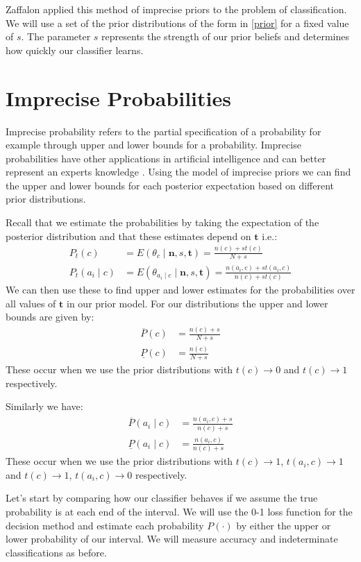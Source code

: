 Zaffalon applied this method of imprecise priors to the problem of classification.
We will use a set of the prior distributions of the form in \cref{prior} for a fixed value of $s$.
The parameter $s$ represents the strength of our prior beliefs and determines how quickly our classifier learns.

\section{Imprecise Probabilities}

Imprecise probability refers to the partial specification of a probability for example through upper and lower bounds for a probability.
Imprecise probabilities have other applications in artificial intelligence and can better represent an experts knowledge \cite{Coolen11}.
Using the model of imprecise priors we can find the upper and lower bounds for each posterior expectation based on different prior distributions.

Recall that we estimate the probabilities by taking the expectation of the posterior distribution and that these estimates depend on $\mathbf{t}$ i.e.:
\begin{align}
	P_t(c) & = E(\theta_c \mid \mathbf{n},s,\mathbf{t}) = \frac{n(c) + st(c)}{N + s} \\
	P_t(a_i \mid c) & = E(\theta_{a_i \mid c} \mid \mathbf{n},s,\mathbf{t}) = \frac{n(a_i, c) + st(a_i, c)}{n(c) + st(c)}
\end{align}
We can then use these to find upper and lower estimates for the probabilities over all values of $\mathbf{t}$ in our prior model.
For our distributions the upper and lower bounds are given by:
\begin{align}
	\overline{P}(c) & = \frac{n(c) + s}{N+s} \\
	\underline{P}(c) & = \frac{n(c)}{N+s}
\end{align}
These occur when we use the prior distributions with $t(c) \rightarrow 0$ and $t(c) \rightarrow 1$ respectively.

Similarly we have:
\begin{align}
	\overline{P}(a_i \mid c) & = \frac{n(a_i, c) + s}{n(c)+s} \\
	\underline{P}(a_i \mid c) & = \frac{n(a_i, c)}{n(c)+s}
\end{align}
These occur when we use the prior distributions with $t(c) \rightarrow 1$, $t(a_i, c)\rightarrow1$ and $t(c) \rightarrow 1$, $t(a_i, c)\rightarrow0$ respectively.

Let's start by comparing how our classifier behaves if we assume the true probability is at each end of the interval.
We will use the 0-1 loss function for the decision method and estimate each probability $P(\cdot)$ by either the upper or lower probability of our interval.
We will measure accuracy and indeterminate classifications as before.


